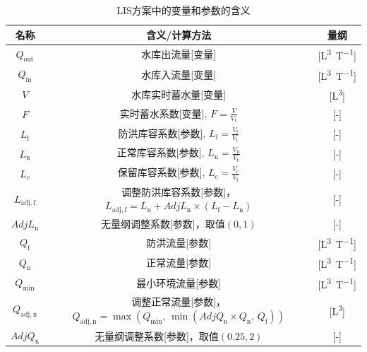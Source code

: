 \begin{table}[htbp]
    \centering
    \caption{LIS方案中的变量和参数的含义}
    \label{tab:LIS方案变量参数表}
    \begin{tabular}{ccc}
    \toprule
    名称 & 含义/计算方法 & 量纲 \\ \midrule
    $Q_{\mathrm{out}}$  & 水库出流量[变量]  &
    [\unit{L^3.T^{-1}}]  \\   $Q_{\mathrm{in}}$ & 水库入流量[变量] & [\unit{L^3.T^{-1}}] \\
    $V$ & 水库实时蓄水量[变量] & [\unit{L^3}] \\
    $F$  &  实时蓄水系数[变量], $F=\frac{V}{V_{\mathrm{t}}}$ & [-] \\
    $L_{\mathrm{f}}$ & 防洪库容系数[参数], $L_{\mathrm{f}}=\frac{V_{\mathrm{f}}}{V_{\mathrm{t}}}$ &[-] \\
    $L_{\mathrm{n}}$  & 正常库容系数[参数], $L_{\mathrm{n}}=\frac{V_{\mathrm{n}}}{V_{\mathrm{t}}}$ & [-]  \\
    $L_{\mathrm{c}}$  & 保留库容系数[参数], $L_{\mathrm{c}}=\frac{V_{\mathrm{c}}}{V_{\mathrm{t}}}$ & [-]  \\
    $L_{\mathrm{adj,f}}$ & \makecell{调整防洪库容系数[参数]，\\$L_{\mathrm{adj,f}} = L_{\mathrm{n}}+AdjL_{\mathrm{n}} \times \left(L_{\mathrm{f}}-L_{\mathrm{n}}\right)$} & [-]  \\
    $AdjL_{\mathrm{n}}$ & 无量纲调整系数[参数]，取值$\left(0,1\right)$ & [-]  \\
    $Q_{\mathrm{f}}$ & 防洪流量[参数] & [\unit{L^3.T^{-1}}]  \\
    $Q_{\mathrm{n}}$ & 正常流量[参数] & [\unit{L^3.T^{-1}}]  \\
    $Q_{\mathrm{min}}$ & 最小环境流量[参数] & [\unit{L^3.T^{-1}}] \\
    $Q_{\mathrm{adj,n}}$ & \makecell{调整正常流量[参数]，\\$Q_{\mathrm{adj,n}}=\max(Q_{\mathrm{min}},\,\min(AdjQ_{\mathrm{n}} \times Q_{\mathrm{n}},\,Q_{\mathrm{f}}))$} & [\unit{L^3}] \\
    $AdjQ_{\mathrm{n}}$ & 无量纲调整系数[参数]，取值$\left(0.25,2\right)$ &
    [-]\\
    \bottomrule
    \end{tabular}
\end{table}

